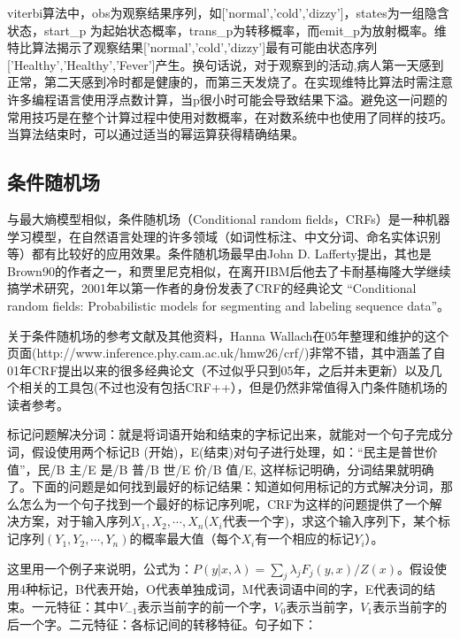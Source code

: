 \par viterbi算法中，obs为观察结果序列，如['normal','cold','dizzy']，states为一组隐含状态，start\_p 为起始状态概率，trans\_p为转移概率，而emit\_p为放射概率。维特比算法揭示了观察结果['normal','cold','dizzy']最有可能由状态序列['Healthy','Healthy','Fever']产生。换句话说，对于观察到的活动,病人第一天感到正常，第二天感到冷时都是健康的，而第三天发烧了。在实现维特比算法时需注意许多编程语言使用浮点数计算，当p很小时可能会导致结果下溢。避免这一问题的常用技巧是在整个计算过程中使用对数概率，在对数系统中也使用了同样的技巧。当算法结束时，可以通过适当的幂运算获得精确结果。
\subsection{条件随机场}
\par 与最大熵模型相似，条件随机场（Conditional random fields，CRFs）是一种机器学习模型，在自然语言处理的许多领域（如词性标注、中文分词、命名实体识别等）都有比较好的应用效果。条件随机场最早由John D. Lafferty提出，其也是Brown90的作者之一，和贾里尼克相似，在离开IBM后他去了卡耐基梅隆大学继续搞学术研究，2001年以第一作者的身份发表了CRF的经典论文 “Conditional random fields: Probabilistic models for segmenting and labeling sequence data”。
\par 关于条件随机场的参考文献及其他资料，Hanna Wallach在05年整理和维护的这个页面(http://www.inference.phy.cam.ac.uk/hmw26/crf/)非常不错，其中涵盖了自01年CRF提出以来的很多经典论文（不过似乎只到05年，之后并未更新）以及几个相关的工具包(不过也没有包括CRF++），但是仍然非常值得入门条件随机场的读者参考。
\par 标记问题解决分词：就是将词语开始和结束的字标记出来，就能对一个句子完成分词，假设使用两个标记B (开始)，E(结束)对句子进行处理，如：“民主是普世价值”，民/B 主/E 是/B 普/B 世/E 价/B 值/E, 这样标记明确，分词结果就明确了。下面的问题是如何找到最好的标记结果：知道如何用标记的方式解决分词，那么怎么为一个句子找到一个最好的标记序列呢，CRF为这样的问题提供了一个解决方案，对于输入序列$X_1,X_2,\cdots,X_n$($X_i$代表一个字)，求这个输入序列下，某个标记序列$(Y_1,Y_2,\cdots,Y_n)$的概率最大值（每个$X_i$有一个相应的标记$Y_i$）。
\par 这里用一个例子来说明，公式为：$P(y|x,\lambda)=\sum _j \lambda_jF_j(y,x)/Z(x)$。假设使用4种标记，B代表开始，O代表单独成词，M代表词语中间的字，E代表词的结束。一元特征：其中$V_{-1}$表示当前字的前一个字，$V_0$表示当前字，$V_1$表示当前字的后一个字。二元特征：各标记间的转移特征。句子如下：
